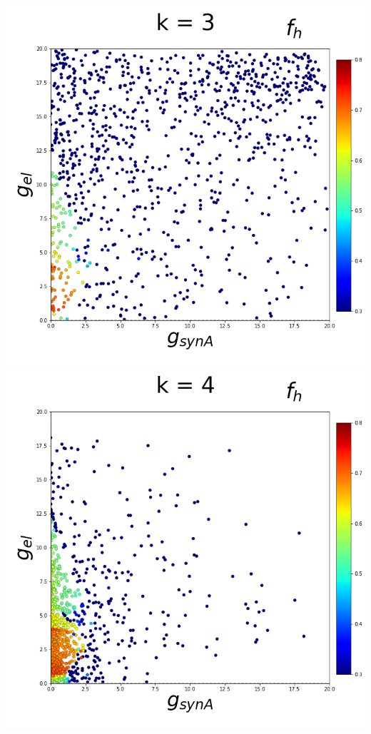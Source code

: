 \documentclass[11pt]{article}
\begin{document}
\begin{center}
\includegraphics[scale=0.125]{DSN_figs/STGCircuit_DSN_c=0_rs=2_k=3.png}
\includegraphics[scale=0.125]{DSN_figs/STGCircuit_DSN_c=0_rs=2_k=4.png}

\end{center}
\end{document}
